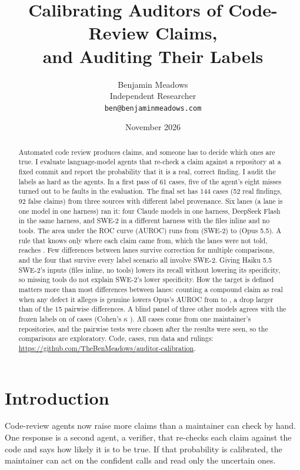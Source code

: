\documentclass[11pt]{article}
\title{Calibrating Auditors of Code-Review Claims,\\and Auditing Their Labels}
\author{Benjamin Meadows\\Independent Researcher\\\texttt{ben@benjaminmeadows.com}}
\date{November 2026}
\begin{document}
\maketitle

\begin{abstract}
Automated code review produces claims, and someone has to decide which ones are true. I evaluate language-model agents that re-check a claim against a repository at a fixed commit and report the probability that it is a real, correct finding. I audit the labels as hard as the agents. In a first pass of 61 cases, five of the agent's eight misses turned out to be faults in the evaluation. The final set has 144 cases (52 real findings, 92 false claims) from three sources with different label provenance. Six lanes (a lane is one model in one harness) ran it: four Claude models in one harness, DeepSeek Flash in the same harness, and SWE-2 in a different harness with the files inline and no tools. The area under the ROC curve (AUROC) runs from  (SWE-2) to  (Opus 5.5). A rule that knows only where each claim came from, which the lanes were not told, reaches . Few differences between lanes survive correction for multiple comparisons, and the four that survive every label scenario all involve SWE-2. Giving Haiku 5.5 SWE-2's inputs (files inline, no tools) lowers its recall without lowering its specificity, so missing tools do not explain SWE-2's lower specificity. How the target is defined matters more than most differences between lanes: counting a compound claim as real when any defect it alleges is genuine lowers Opus's AUROC from  to , a drop larger than  of the 15 pairwise differences. A blind panel of three other models agrees with the frozen labels on  of cases (Cohen's $\kappa$ ). All cases come from one maintainer's repositories, and the pairwise tests were chosen after the results were seen, so the comparisons are exploratory. Code, cases, run data and rulings: \url{https://github.com/TheBenMeadows/auditor-calibration}.
\end{abstract}

\section{Introduction}

Code-review agents now raise more claims than a maintainer can check by hand. One response is a second agent, a verifier, that re-checks each claim against the code and says how likely it is to be true. If that probability is calibrated, the maintainer can act on the confident calls and read only the uncertain ones.
\end{document}
